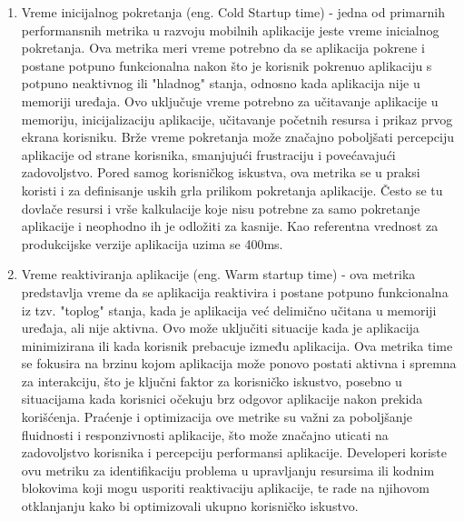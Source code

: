 \documentclass[12pt,oneside]{memoir}
\begin{document}
\begin{enumerate}
    \item Vreme inicijalnog pokretanja (eng. Cold Startup time) - jedna od primarnih performansnih metrika u razvoju mobilnih aplikacije jeste vreme inicialnog pokretanja. Ova metrika meri vreme potrebno da se aplikacija pokrene i postane potpuno funkcionalna nakon što je korisnik pokrenuo aplikaciju s potpuno neaktivnog ili "hladnog" stanja, odnosno kada aplikacija nije u memoriji uređaja. Ovo uključuje vreme potrebno za učitavanje aplikacije u memoriju, inicijalizaciju aplikacije, učitavanje početnih resursa i prikaz prvog ekrana korisniku. Brže vreme pokretanja može značajno poboljšati percepciju aplikacije od strane korisnika, smanjujući frustraciju i povećavajući zadovoljstvo. Pored samog korisničkog iskustva, ova metrika se u praksi koristi i za definisanje uskih grla prilikom pokretanja aplikacije. Često se tu dovlače resursi i vrše kalkulacije koje nisu potrebne za samo pokretanje aplikacije i neophodno ih je odložiti za kasnije. Kao referentna vrednost za produkcijske verzije aplikacija uzima se 400ms.
    \item Vreme reaktiviranja aplikacije (eng. Warm startup time) - ova metrika predstavlja vreme da se aplikacija reaktivira i postane potpuno funkcionalna iz tzv. "toplog" stanja, kada je aplikacija već delimično učitana u memoriji uređaja, ali nije aktivna. Ovo može uključiti situacije kada je aplikacija minimizirana ili kada korisnik prebacuje između aplikacija. Ova metrika time se fokusira na brzinu kojom aplikacija može ponovo postati aktivna i spremna za interakciju, što je ključni faktor za korisničko iskustvo, posebno u situacijama kada korisnici očekuju brz odgovor aplikacije nakon prekida korišćenja. Praćenje i optimizacija ove metrike su važni za poboljšanje fluidnosti i responzivnosti aplikacije, što može značajno uticati na zadovoljstvo korisnika i percepciju performansi aplikacije. Developeri koriste ovu metriku za identifikaciju problema u upravljanju resursima ili kodnim blokovima koji mogu usporiti reaktivaciju aplikacije, te rade na njihovom otklanjanju kako bi optimizovali ukupno korisničko iskustvo.

\end{enumerate}
\end{document}
